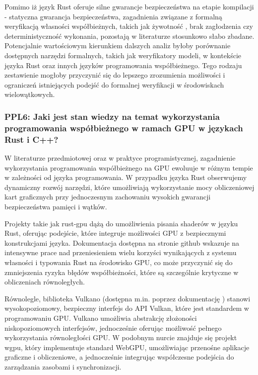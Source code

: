 \begin{itemize}
    Pomimo iż język Rust oferuje silne gwarancje bezpieczeństwa na etapie kompilacji - statyczna gwarancja bezpieczeństwa, zagadnienia związane z formalną weryfikacją własności współbieżnych, takich jak żywotność , brak zagłodzenia  czy deterministyczność wykonania, pozostają w literaturze stosunkowo słabo zbadane. Potencjalnie wartościowym kierunkiem dalszych analiz byłoby porównanie dostępnych narzędzi formalnych, takich jak weryfikatory modeli, w kontekście języka Rust oraz innych języków programowania współbieżnego. Tego rodzaju zestawienie mogłoby przyczynić się do lepszego zrozumienia możliwości i ograniczeń istniejących podejść do formalnej weryfikacji w środowiskach wielowątkowych.
\end{itemize}


\subsubsection{PPL6: Jaki jest stan wiedzy na temat wykorzystania programowania współbieżnego w ramach GPU w językach Rust i C++?}
W literaturze przedmiotowej oraz w praktyce programistycznej, zagadnienie wykorzystania programowania współbieżnego na GPU ewoluuje w różnym tempie w zależności od języka programowania. W przypadku języka Rust obserwujemy dynamiczny rozwój narzędzi, które umożliwiają wykorzystanie mocy obliczeniowej kart graficznych przy jednoczesnym zachowaniu wysokich gwarancji bezpieczeństwa pamięci i wątków.

Projekty takie jak rust‑gpu \cite{rustgpuRust} dążą do umożliwienia pisania shaderów w języku Rust, oferując podejście, które integruje możliwości GPU z bezpiecznymi konstrukcjami języka. Dokumentacja dostępna na stronie github \cite{rustgpuRust} wskazuje na intensywne prace nad przeniesieniem wielu korzyści wynikających z systemu własności i typowania Rust na środowisko GPU, co może przyczynić się do zmniejszenia ryzyka błędów współbieżności, które są szczególnie krytyczne w obliczeniach równoległych.

Równolegle, biblioteka Vulkano (dostępna m.in. poprzez dokumentację \cite{docsVulkanoRust}) stanowi wysokopoziomowy, bezpieczny interfejs do API Vulkan, które jest standardem w programowaniu GPU. Vulkano umożliwia abstrakcję złożoności niskopoziomowych interfejsów, jednocześnie oferując możliwość pełnego wykorzystania równoległości GPU. W podobnym nurcie znajduje się projekt wgpu, który implementuje standard WebGPU, umożliwiając przenośne aplikacje graficzne i obliczeniowe, a jednocześnie integrując współczesne podejścia do zarządzania zasobami i synchronizacji.

